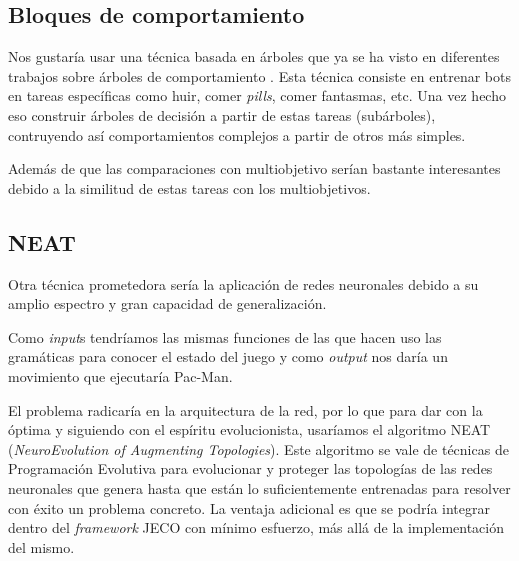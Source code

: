 \subsection{Bloques de comportamiento}
Nos gustaría usar una técnica basada en árboles que ya se ha visto en diferentes trabajos sobre árboles de comportamiento \cite{lim2010evolving} \cite{perez2011evolving}. Esta técnica consiste en entrenar bots en tareas específicas como huir, comer \textit{pills}, comer fantasmas, etc. Una vez hecho eso construir árboles de decisión a partir de estas tareas (subárboles), contruyendo así comportamientos complejos a partir de otros más simples.

Además de que las comparaciones con multiobjetivo serían bastante interesantes debido a la similitud de estas tareas con los multiobjetivos.

\subsection{NEAT}
Otra técnica prometedora sería la aplicación de redes neuronales debido a su amplio espectro y gran capacidad de generalización.

Como \textit{input}s tendríamos las mismas funciones de las que hacen uso las gramáticas para conocer el estado del juego y como \textit{output} nos daría un movimiento que ejecutaría Pac-Man.

El problema radicaría en la arquitectura de la red, por lo que para dar con la óptima y siguiendo con el espíritu evolucionista, usaríamos el algoritmo NEAT \cite{stanley2002evolving} (\textit{NeuroEvolution of Augmenting Topologies}). Este algoritmo se vale de técnicas de Programación Evolutiva para evolucionar y proteger las topologías de las redes neuronales que genera hasta que están lo suficientemente entrenadas para resolver con éxito un problema concreto. La ventaja adicional es que se podría integrar dentro del \textit{framework} JECO con mínimo esfuerzo, más allá de la implementación del mismo.
